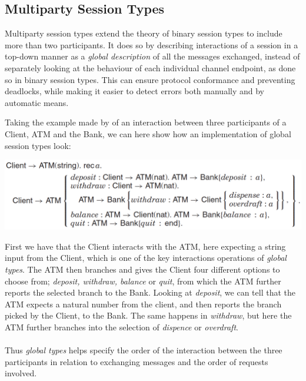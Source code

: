 
\subsection{Multiparty Session Types}
Multiparty session types extend the theory of binary session types to include more than two participants. It does so by describing interactions of a session in a top-down manner as a \textit{global description} of all the messages exchanged, instead of separately looking at the behaviour of each individual channel endpoint, as done so in binary session types. This can ensure protocol conformance and preventing deadlocks, while making it easier to detect errors both manually and by automatic means.  %

Taking the example made by \citeauthor{DBLP:journals/csur/HuttelLVCCDMPRT16} of an interaction between three participants of a Client, ATM and the Bank, we can here show how an implementation of global session types look:
\begin{center}
\includegraphics[width=1.0\textwidth, angle=0]{Graphics/Client_ATM.pdf}
\end{center}
First we have that the Client interacts with the ATM, here expecting a string input from the Client, which is one of the key interactions operations of \textit{global types}. The ATM then branches and gives the Client four different options to choose from; \textit{deposit, withdraw, balance} or \textit{quit}, from which the ATM further reports the selected branch to the Bank. Looking at \textit{deposit}, we can tell that the ATM expects a natural number from the client, and then reports the branch picked by the Client, to the Bank. The same happens in \textit{withdraw}, but here the ATM further branches into the selection of \textit{dispence} or \textit{overdraft}.
\\ \\
Thus \textit{global types} helps specify the order of the interaction between the three participants in relation to exchanging messages and the order of requests involved.  \\ \\


